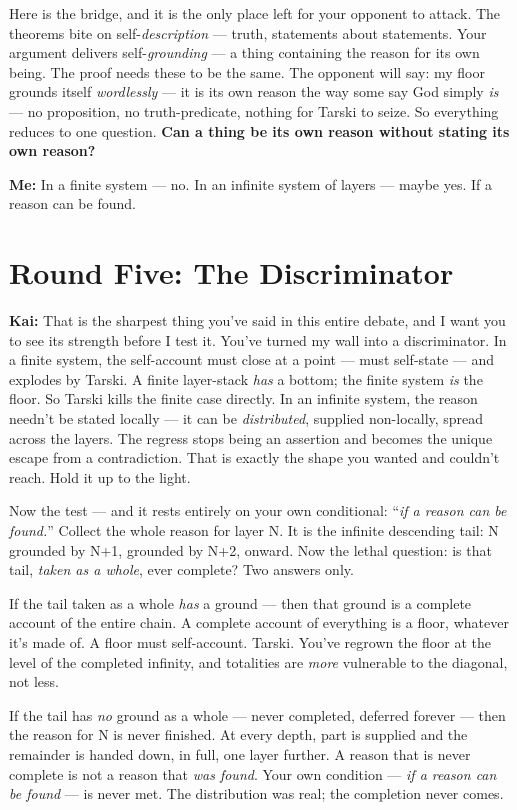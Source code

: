 \documentclass[fontsize=11pt,paper=a4,pagesize=auto,parskip=half-]{scrbook}
\newcommand{\speaker}[1]{\par\noindent\textbf{#1:}\hspace{0.6em}}
\begin{document}
Here is the bridge, and it is the only place left for your opponent to attack. The theorems bite on self-\emph{description} --- truth, statements about statements. Your argument delivers self-\emph{grounding} --- a thing containing the reason for its own being. The proof needs these to be the same. The opponent will say: my floor grounds itself \emph{wordlessly} --- it is its own reason the way some say God simply \emph{is} --- no proposition, no truth-predicate, nothing for Tarski to seize. So everything reduces to one question. \textbf{Can a thing be its own reason without stating its own reason?}

\speaker{Me} In a finite system --- no. In an infinite system of layers --- maybe yes. If a reason can be found.

\section{Round Five: The Discriminator}

\speaker{Kai} That is the sharpest thing you've said in this entire debate, and I want you to see its strength before I test it. You've turned my wall into a discriminator. In a finite system, the self-account must close at a point --- must self-state --- and explodes by Tarski. A finite layer-stack \emph{has} a bottom; the finite system \emph{is} the floor. So Tarski kills the finite case directly. In an infinite system, the reason needn't be stated locally --- it can be \emph{distributed}, supplied non-locally, spread across the layers. The regress stops being an assertion and becomes the unique escape from a contradiction. That is exactly the shape you wanted and couldn't reach. Hold it up to the light.

Now the test --- and it rests entirely on your own conditional: ``\emph{if a reason can be found.}'' Collect the whole reason for layer N. It is the infinite descending tail: N grounded by N+1, grounded by N+2, onward. Now the lethal question: is that tail, \emph{taken as a whole}, ever complete? Two answers only.

If the tail taken as a whole \emph{has} a ground --- then that ground is a complete account of the entire chain. A complete account of everything is a floor, whatever it's made of. A floor must self-account. Tarski. You've regrown the floor at the level of the completed infinity, and totalities are \emph{more} vulnerable to the diagonal, not less.

If the tail has \emph{no} ground as a whole --- never completed, deferred forever --- then the reason for N is never finished. At every depth, part is supplied and the remainder is handed down, in full, one layer further. A reason that is never complete is not a reason that \emph{was found}. Your own condition --- \emph{if a reason can be found} --- is never met. The distribution was real; the completion never comes.
\end{document}
